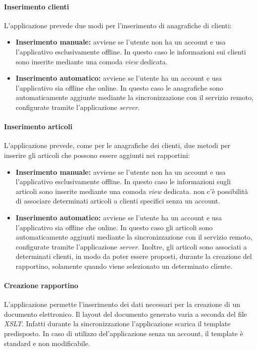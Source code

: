 \paragraph{Inserimento clienti}
L'applicazione prevede due modi per l'inserimento di anagrafiche di clienti:
\begin{itemize}
	\item \textbf{Inserimento manuale:} avviene se l'utente non ha un account e usa l'applicativo esclusivamente offline. In questo caso le informazioni sui clienti sono inserite mediante una comoda \textit{view} dedicata. 
	\item \textbf{Inserimento automatico:} avviene se l'utente ha un account e usa l'applicativo sia offline che online. In questo caso le anagrafiche sono automaticamente aggiunte mediante la sincronizzazione con il servizio remoto, configurate tramite l'applicazione \textit{server}.
\end{itemize}

\paragraph{Inserimento articoli}
L'applicazione prevede, come per le anagrafiche dei clienti, due metodi per inserire gli articoli che possono essere aggiunti nei rapportini:
\begin{itemize}
	\item \textbf{Inserimento manuale:} avviene se l'utente non ha un account e usa l'applicativo esclusivamente offline. In questo caso le informazioni sugli articoli sono inserite mediante una comoda \textit{view} dedicata. non c'è possibilità di associare determinati articoli a clienti specifici senza un account.
	\item \textbf{Inserimento automatico:} avviene se l'utente ha un account e usa l'applicativo sia offline che online. In questo caso gli articoli sono automaticamente aggiunti mediante la sincronizzazione con il servizio remoto, configurate tramite l'applicazione \textit{server}. Inoltre, gli articoli sono associati a determinati clienti, in modo da poter essere proposti, durante la creazione del rapportino, solamente quando viene selezionato un determinato cliente.
\end{itemize}

\paragraph{Creazione rapportino}
L'applicazione permette l'inserimento dei dati necessari per la creazione di un documento elettronico. Il layout del documento generato varia a seconda del file \textit{XSLT}. Infatti durante la sincronizzazione l'applicazione scarica il template predisposto. In caso di utilizzo del'applicazione senza un account, il template è standard e non modificabile. 